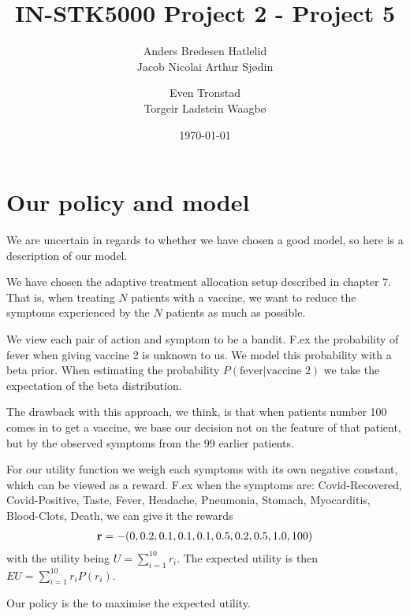 \documentclass[a4paper, 12pt]{extarticle}
\title{IN-STK5000 Project 2 - Project 5}
\author{Anders Bredesen Hatlelid \\
        Jacob Nicolai Arthur Sjødin \\
        \and
        Even Tronstad \\
        Torgeir Ladstein Waagbø 
}
\date{\today}
\begin{document}
\maketitle
\section{Our policy and model}
We are uncertain in regards to whether we have chosen a good model, so here is a description of our model. 

We have chosen the adaptive treatment allocation setup described in chapter 7. 
That is, when treating $N$ patients with a vaccine, we want to reduce the symptoms experienced by the $N$ patients as much as possible. 

We view each pair of action and symptom to be a bandit.
F.ex the probability of fever when giving vaccine 2 is unknown to us. 
We model this probability with a beta prior. 
When estimating the probability $P(\text{fever}|\text{vaccine 2})$ we take the expectation of the beta distribution. 

The drawback with this approach, we think, is that when patients number 100 comes in to get a vaccine, we base our decision not on the feature of that patient, but by the observed symptoms from the 99 earlier patients. 

For our utility function we weigh each symptoms with its own negative constant, which can be viewed as a reward.
F.ex when the symptoms are: Covid-Recovered, Covid-Positive, Taste, Fever, Headache, Pneumonia, Stomach, Myocarditis, Blood-Clots, Death, we can give it the rewards
\begin{align*}
    \bold{r} = -(0, 0.2, 0.1, 0.1, 0.1, 0.5, 0.2, 0.5, 1.0, 100)
\end{align*}
with the utility being $U=\sum_{i=1}^{10} r_i$. 
The expected utility is then $EU = \sum_{i=1}^{10} r_i P(r_i)$. 

Our policy is the to maximise the expected utility. 
\end{document}
